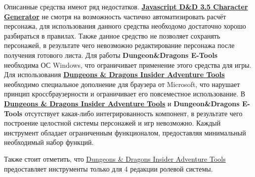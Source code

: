 Описанные средства имеют ряд недостатков.
\textbf{\href{http://www.pathguy.com/cg35.htm}{Javascript D\&D 3.5 Character Generator}} не смотря на возможность частично автоматизировать расчёт персонажа, для использования данного средства необходомо достаточно хорошо разбираться в правилах. Также данное средство не позволяет сохранять персонажей, в результате чего невозможно редактирование персонажа после получения готового листа.
Для работы \textbf{Dungeon\&Dragons E-Tools} необходима ОС Windows, что ограничивает применение этого средства для игры.
Для использования \textbf{\href{http://www.wizards.com/dnd/Tool.aspx?x=dnd/4new/tool/adventuretools}{Dungeons \& Dragons Insider Adventure Tools}} необходимо специальное дополнение для браузера от Microsoft, что нарушает принцип кроссбраузерности и ограничивает его повсеместное использование.
В \textbf{\href{http://www.wizards.com/dnd/Tool.aspx?x=dnd/4new/tool/adventuretools}{Dungeons \& Dragons Insider Adventure Tools}} и \textbf{Dungeon\&Dragons E-Tools} отсутствует какая-либо интегрированность компонент, в результате чего построение целостной системы персонажей и игр невозможно. Каждый инструмент обладает ограниченным функционалом, предоставляя минимальный необходимый набор функций.

Также стоит отметить, что \href{http://www.wizards.com/dnd/Tool.aspx?x=dnd/4new/tool/adventuretools}{Dungeons \& Dragons Insider Adventure Tools} предоставляет инструменты только для 4 редакции ролевой системы.
